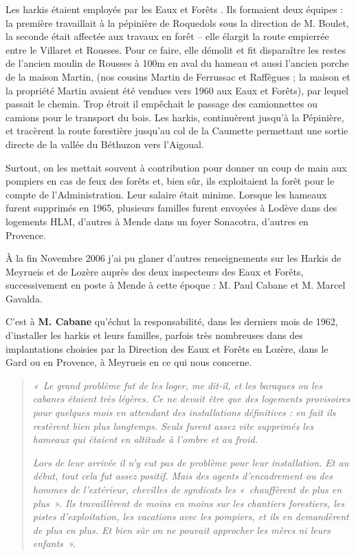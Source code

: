 
Les harkis étaient employés par les \og Eaux et Forêts \fg{}. Ils formaient deux équipes :
la première travaillait à la pépinière de Roquedols sous la direction de M. Boulet, la seconde était affectée aux travaux en forêt -- elle élargit la route empierrée entre le Villaret et
Rousses. Pour ce faire, elle démolit et fit disparaître les restes de l’ancien moulin de
Rousses à 100m en aval du hameau et aussi l’ancien porche de la maison Martin, (nos
cousins Martin de Ferrussac et Raffègues ; la maison et la propriété Martin avaient été vendues vers
1960 aux Eaux et Forêts), par lequel passait le chemin. Trop étroit il empêchait le passage
des camionnettes ou camions pour le transport du bois.
Les harkis, continuèrent jusqu’à la Pépinière, et tracèrent la route forestière
jusqu’au col de la Caumette permettant une sortie directe de la vallée du Béthuzon vers
l’Aigoual.

Surtout, on les mettait souvent à contribution pour donner un coup de main aux
pompiers en cas de feux des forêts et, bien sûr, ils exploitaient la forêt pour le compte
de l’Administration. Leur salaire était minime.
Lorsque les hameaux furent supprimés en 1965, plusieurs familles furent envoyées à
Lodève dans des logements HLM, d’autres à Mende dans un foyer Sonacotra, d’autres
en Provence.

À la fin Novembre 2006 j’ai pu glaner d’autres renseignements sur les Harkis de
Meyrueis et de Lozère auprès des deux inspecteurs des Eaux et Forêts, successivement
en poste à Mende à cette époque : M. Paul Cabane et M. Marcel Gavalda.

C’est à \textbf{M. Cabane} qu’échut la responsabilité, dans les derniers mois de
1962, d’installer les harkis et leurs familles, parfois très nombreuses dans des
implantations choisies par la Direction des Eaux et Forêts en Lozère, dans le Gard ou
en Provence, à Meyrueis en ce qui nous concerne.

\begin{quote}
\textit{«~Le grand problème fut de les loger, me dit-il, et les baraques ou les cabanes
étaient très légères. Ce ne devait être que des logements provisoires pour quelques
mois en attendant des installations définitives : en fait ils restèrent bien plus
longtemps. Seuls furent assez vite supprimés les hameaux qui étaient en altitude à
l’ombre et au froid.}

\textit{Lors de leur arrivée il n’y eut pas de problème pour leur installation. Et au début,
tout cela fut assez positif. Mais des agents d’encadrement ou des hommes de
l’extérieur, chevilles de syndicats les «~chauffèrent de plus en plus~». Ils travaillèrent
de moins en moins sur les chantiers forestiers, les pistes d’exploitation, les vacations
avec les pompiers, et ils en demandèrent de plus en plus. Et bien sûr on ne pouvait
approcher les mères ni leurs enfants~».}
\end{quote}

